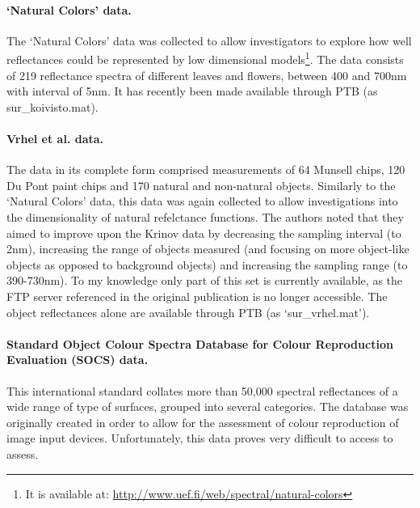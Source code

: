 \paragraph{`Natural Colors' data.}
The `Natural Colors' data \citep{parkkinen_spectral_1988} was collected to allow investigators to explore how well reflectances could be represented by low dimensional models\footnote{It is available at: \url{http://www.uef.fi/web/spectral/natural-colors}}. The data consists of 219 reflectance spectra of different leaves and flowers, between 400 and 700nm with interval of 5nm. It has recently been made available through \gls{PTB} (as sur\_koivisto.mat).

\paragraph{Vrhel et al. data.}
The \citet{vrhel_measurement_1994} data in its complete form comprised measurements of 64 Munsell chips, 120 Du Pont paint chips and 170 natural and non-natural objects. Similarly to the `Natural Colors' data, this data was again collected to allow investigations into the dimensionality of natural refelctance functions. The authors noted that they aimed to improve upon the Krinov data by decreasing the sampling interval (to 2nm), increasing the range of objects measured (and focusing on more object-like objects as opposed to background objects) and increasing the sampling range (to 390-730nm). To my knowledge only part of this set is currently available, as the FTP server referenced in the original publication is no longer accessible. The object reflectances alone are available through \gls{PTB} (as `sur\_vrhel.mat').

\paragraph{Standard Object Colour Spectra Database for Colour Reproduction Evaluation (SOCS) data.}
This international standard \citep{tajima_development_1998,iso/tc_130_graphic_technology_iso/tr_2003} collates more than 50,000 spectral reflectances of a wide range of type of surfaces, grouped into several categories. The database was originally created in order to allow for the assessment of colour reproduction of image input devices. Unfortunately, this data proves very difficult to access to assess.

